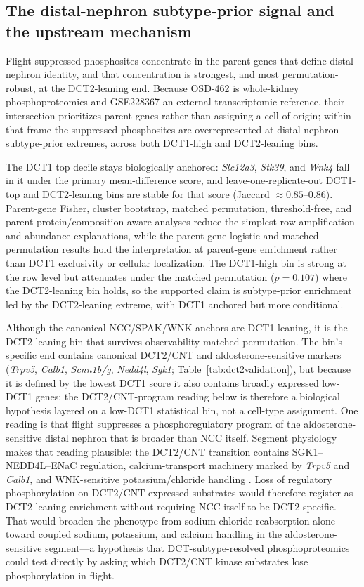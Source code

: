 \documentclass[11pt]{article}
\newcommand{\gene}[1]{\textit{#1}}
\begin{document}
\subsection{The distal-nephron subtype-prior signal and the upstream mechanism}

Flight-suppressed phosphosites concentrate in the parent genes that define distal-nephron identity, and that concentration is strongest, and most permutation-robust, at the DCT2-leaning end. Because OSD-462 is whole-kidney phosphoproteomics and GSE228367 an external transcriptomic reference, their intersection prioritizes parent genes rather than assigning a cell of origin; within that frame the suppressed phosphosites are overrepresented at distal-nephron subtype-prior extremes, across both DCT1-high and DCT2-leaning bins.

The DCT1 top decile stays biologically anchored: \gene{Slc12a3}, \gene{Stk39}, and \gene{Wnk4} fall in it under the primary mean-difference score, and leave-one-replicate-out DCT1-top and DCT2-leaning bins are stable for that score (Jaccard $\approx0.85$--$0.86$). Parent-gene Fisher, cluster bootstrap, matched permutation, threshold-free, and parent-protein/composition-aware analyses reduce the simplest row-amplification and abundance explanations, while the parent-gene logistic and matched-permutation results hold the interpretation at parent-gene enrichment rather than DCT1 exclusivity or cellular localization. The DCT1-high bin is strong at the row level but attenuates under the matched permutation ($p=0.107$) where the DCT2-leaning bin holds, so the supported claim is subtype-prior enrichment led by the DCT2-leaning extreme, with DCT1 anchored but more conditional.

Although the canonical NCC/SPAK/WNK anchors are DCT1-leaning, it is the DCT2-leaning bin that survives observability-matched permutation. The bin's specific end contains canonical DCT2/CNT and aldosterone-sensitive markers (\gene{Trpv5}, \gene{Calb1}, \gene{Scnn1b/g}, \gene{Nedd4l}, \gene{Sgk1}; Table~\ref{tab:dct2validation}), but because it is defined by the lowest DCT1 score it also contains broadly expressed low-DCT1 genes; the DCT2/CNT-program reading below is therefore a biological hypothesis layered on a low-DCT1 statistical bin, not a cell-type assignment. One reading is that flight suppresses a phosphoregulatory program of the aldosterone-sensitive distal nephron that is broader than NCC itself. Segment physiology makes that reading plausible: the DCT2/CNT transition contains SGK1--NEDD4L--ENaC regulation, calcium-transport machinery marked by \gene{Trpv5} and \gene{Calb1}, and WNK-sensitive potassium/chloride handling \citep{arroyo2011aldosterone,subramanya2014dct,terker2015potassium,su2024dct}. Loss of regulatory phosphorylation on DCT2/CNT-expressed substrates would therefore register as DCT2-leaning enrichment without requiring NCC itself to be DCT2-specific. That would broaden the phenotype from sodium-chloride reabsorption alone toward coupled sodium, potassium, and calcium handling in the aldosterone-sensitive segment---a hypothesis that DCT-subtype-resolved phosphoproteomics could test directly by asking which DCT2/CNT kinase substrates lose phosphorylation in flight.
\end{document}
